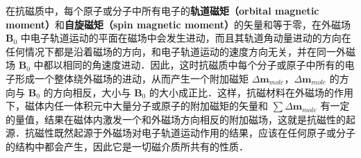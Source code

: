 
\begin{issues}
\issueDraft
{}
\end{issues}

在抗磁质中，每个原子或分子中所有电子的\textbf{轨道磁矩（orbital magnetic moment）}和\textbf{自旋磁矩（spin magnetic moment）}的矢量和等于零，在外磁场 $\mathbf B_0$ 中电子轨道运动的平面在磁场中会发生进动，而且其轨道角动量进动的方向在任何情况下都是沿着磁场的方向，和电子轨道运动的速度方向无关，并在同一外磁场 $\mathbf B_0$ 中都以相同的角速度进动．因此，这时抗磁质中每个分子或原子中所有的电子形成一个整体绕外磁场的进动，从而产生一个附加磁矩 $\Delta\mathbf{m}_{mole}$，$\Delta\mathbf{m}_{mole}$ 的方向与 $\mathbf B_0$ 的方向相反，大小与 $\mathbf B_0$ 的大小成正比．这样，抗磁材料在外磁场的作用下，磁体内任一体积元中大量分子或原子的附加磁矩的矢量和 $\sum \Delta\mathbf{m}_{mole}$ 有一定的量值，结果在磁体内激发一个和外磁场方向相反的附加磁场，这就是抗磁性的起源．抗磁性既然起源于外磁场对电子轨道运动作用的结果，应该在任何原子或分子的结构中都会产生，因此它是一切磁介质所共有的性质．
